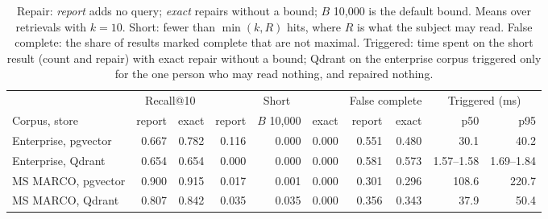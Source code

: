 \begin{table}[tbp]
\centering
\footnotesize
\setlength{\tabcolsep}{4pt}
\begin{tabular}{@{}lrrrrrrrrr@{}}
\toprule
 & \multicolumn{2}{c}{Recall@10} & \multicolumn{3}{c}{Short} & \multicolumn{2}{c}{False complete} & \multicolumn{2}{c}{Triggered (ms)} \\
\cmidrule(lr){2-3}\cmidrule(lr){4-6}\cmidrule(lr){7-8}\cmidrule(lr){9-10}
Corpus, store & report & exact & report & $B$ 10,000 & exact & report & exact & p50 & p95 \\
\midrule
Enterprise, pgvector & 0.667 & 0.782 & 0.116 & 0.000 & 0.000 & 0.551 & 0.480 & 30.1 & 40.2 \\
Enterprise, Qdrant & 0.654 & 0.654 & 0.000 & 0.000 & 0.000 & 0.581 & 0.573 & 1.57--1.58 & 1.69--1.84 \\
MS MARCO, pgvector & 0.900 & 0.915 & 0.017 & 0.001 & 0.000 & 0.301 & 0.296 & 108.6 & 220.7 \\
MS MARCO, Qdrant & 0.807 & 0.842 & 0.035 & 0.035 & 0.000 & 0.356 & 0.343 & 37.9 & 50.4 \\
\bottomrule
\end{tabular}
\caption{Repair: \emph{report} adds no query; \emph{exact} repairs without a bound; $B$ 10,000 is the default bound.
Means over retrievals with $k = 10$. Short: fewer than $\min(k, R)$ hits, where $R$ is what the subject may read. False
complete: the share of results marked complete that are not maximal. Triggered: time spent on the short result (count and
repair) with exact repair without a bound; Qdrant on the enterprise corpus triggered only for the one person who may read nothing,
and repaired nothing.}
\label{tab:rep-summary}
\end{table}

